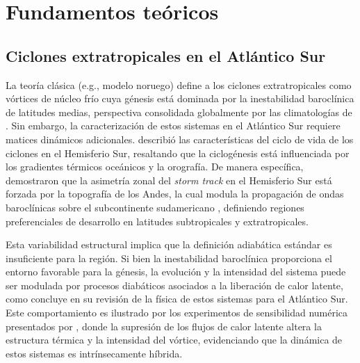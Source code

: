 \chapter{Fundamentos teóricos}\label{ch:theoretical_background}


\section{Ciclones extratropicales en el Atlántico Sur}\label{sec:tb_fundamentos}

La teoría clásica (e.g., modelo noruego) define a los ciclones extratropicales como vórtices de núcleo frío cuya génesis está dominada por la inestabilidad baroclínica de latitudes medias, perspectiva consolidada globalmente por las climatologías de \citet{hoskins2005new}. Sin embargo, la caracterización de estos sistemas en el Atlántico Sur requiere matices dinámicos adicionales. \citet{sinclair1995climatology} describió las características del ciclo de vida de los ciclones en el Hemisferio Sur, resaltando que la ciclogénesis está influenciada por los gradientes térmicos oceánicos y la orografía. De manera específica, \citet{inatsu2004zonal} demostraron que la asimetría zonal del \textit{storm track} en el Hemisferio Sur está forzada por la topografía de los Andes, la cual modula la propagación de ondas baroclínicas sobre el subcontinente sudamericano \citep{vera2002cold}, definiendo regiones preferenciales de desarrollo en latitudes subtropicales y extratropicales.

Esta variabilidad estructural implica que la definición adiabática estándar es insuficiente para la región. Si bien la inestabilidad baroclínica proporciona el entorno favorable para la génesis, la evolución y la intensidad del sistema puede ser modulada por procesos diabáticos asociados a la liberación de calor latente, como concluye \citet{coutodesouza2024thesis} en su revisión de la física de estos sistemas para el Atlántico Sur. Este comportamiento es ilustrado por los experimentos de sensibilidad numérica presentados por \citet{reboita2022from}, donde la supresión de los flujos de calor latente altera la estructura térmica y la intensidad del vórtice, evidenciando que la dinámica de estos sistemas es intrínsecamente híbrida.

